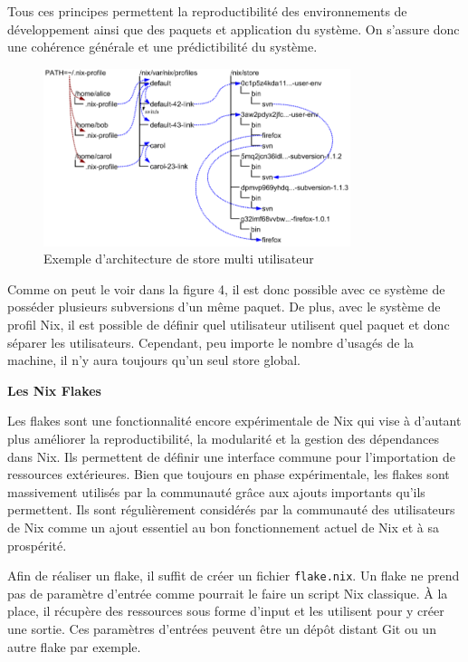 \documentclass[a4paper,french,12pt, titlepage]{article}
\begin{document}
Tous ces principes permettent la reproductibilité des environnements de
développement ainsi que des paquets et application du système. On
s'assure donc une cohérence générale et une prédictibilité du
système.\newline

\begin{figure}[h]
\centering
\includegraphics[width=0.8\textwidth,height=0.8\textheight,keepaspectratio]{images/store.png}
\caption{Exemple d'architecture de store multi utilisateur}
\end{figure}

Comme on peut le voir dans la figure 4, il est donc possible avec ce
système de posséder plusieurs subversions d'un même paquet. De plus,
avec le système de profil Nix, il est possible de définir quel
utilisateur utilisent quel paquet et donc séparer les utilisateurs.
Cependant, peu importe le nombre d'usagés de la machine, il n'y aura
toujours qu'un seul store global.\newline

\textbf{Les Nix Flakes}\newline

Les flakes sont une fonctionnalité encore expérimentale de Nix qui vise
à d'autant plus améliorer la reproductibilité, la modularité et la
gestion des dépendances dans Nix. Ils permettent de définir une
interface commune pour l'importation de ressources extérieures. Bien que
toujours en phase expérimentale, les flakes sont massivement utilisés
par la communauté grâce aux ajouts importants qu'ils permettent. Ils
sont régulièrement considérés par la communauté des utilisateurs de Nix
comme un ajout essentiel au bon fonctionnement actuel de Nix et à sa
prospérité.\newline

Afin de réaliser un flake, il suffit de créer un fichier
\texttt{flake.nix}. Un flake ne prend pas de paramètre d'entrée comme
pourrait le faire un script Nix classique. À la place, il récupère des
ressources sous forme d'input et les utilisent pour y créer une sortie.
Ces paramètres d'entrées peuvent être un dépôt distant Git ou un autre
flake par exemple.\newline
\end{document}
